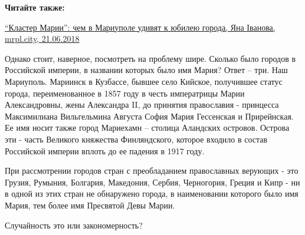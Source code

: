 \textbf{Читайте также:} 

\href{https://mrpl.city/news/view/klaster-marii-chem-v-mariupole-udivyat-k-yubileyu-goroda-foto}{%
\enquote{Кластер Марии}: чем в Мариуполе удивят к юбилею города, Яна Іванова, mrpl.city, 21.06.2018}

Однако стоит, наверное, посмотреть на проблему шире. Сколько было городов в
Российской империи, в названии которых было имя Мария? Ответ – три. Наш
Мариуполь. Мариинск в Кузбассе, бывшее село Кийское, получившее статус города,
переименованное в 1857 году в честь императрицы Марии Александровны, жены
Александра II, до принятия православия - принцесса Максимилиана Вильгельмина
Августа София Мария Гессенская и Прирейнская. Ее имя носит также город
Мариехамн – столица Аландских островов. Острова эти - часть Великого княжества
Финляндского, которое входило в состав Российской империи вплоть до ее падения
в 1917 году.

При рассмотрении городов стран с преобладанием православных верующих - это
Грузия, Румыния, Болгария, Македония, Сербия, Черногория, Греция и Кипр - ни в
одной из этих стран не обнаружено города, в наименовании которого было имя
Мария, тем более имя Пресвятой Девы Марии.

Случайность это или закономерность?
